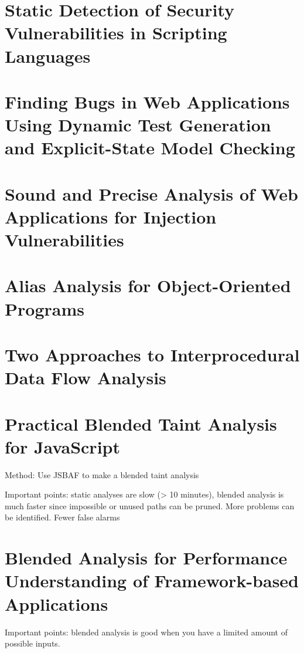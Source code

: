 \section{Static Detection of Security Vulnerabilities in Scripting Languages}

\section{Finding Bugs in Web Applications Using Dynamic Test Generation and Explicit-State Model Checking}


\section{Sound and Precise Analysis of Web Applications for Injection Vulnerabilities}

\section{Alias Analysis for Object-Oriented Programs}

\section{Two Approaches to Interprocedural Data Flow Analysis}

\section{Practical Blended Taint Analysis for JavaScript}
Method: Use JSBAF to make a blended taint analysis

Important points: static analyses are slow (> 10 minutes), blended analysis is much faster since impossible or unused paths can be pruned. More problems can be identified. Fewer false alarms

\section{Blended Analysis for Performance Understanding of Framework-based Applications}
Important points: blended analysis is good when you have a limited amount of possible inputs.
